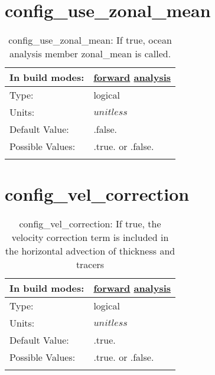 \section[config\_use\_zonal\_mean]{config\_use\_zonal\_mean}
\label{sec:nm_sec_config_use_zonal_mean}
\begin{center}
\begin{longtable}{| p{2.0in} || p{4.0in} |}
    \hline
    In build modes: & \hyperref[subsec:forward_nm_tab_zonal_mean]{forward} \hyperref[subsec:analysis_nm_tab_zonal_mean]{analysis} \\
    \hline
    Type: & logical \\
    \hline
    Units: & $unitless$ \\
    \hline
    Default Value: & .false. \\
    \hline
    Possible Values: & .true. or .false. \\
    \hline
    \caption{config\_use\_zonal\_mean: If true, ocean analysis member zonal\_mean is called.}
\end{longtable}
\end{center}
\section[config\_vel\_correction]{config\_vel\_correction}
\label{sec:nm_sec_config_vel_correction}
\begin{center}
\begin{longtable}{| p{2.0in} || p{4.0in} |}
    \hline
    In build modes: & \hyperref[subsec:forward_nm_tab_split_explicit_ts]{forward} \hyperref[subsec:analysis_nm_tab_split_explicit_ts]{analysis} \\
    \hline
    Type: & logical \\
    \hline
    Units: & $unitless$ \\
    \hline
    Default Value: & .true. \\
    \hline
    Possible Values: & .true. or .false. \\
    \hline
    \caption{config\_vel\_correction: If true, the velocity correction term is included in the horizontal advection of thickness and tracers}
\end{longtable}
\end{center}
